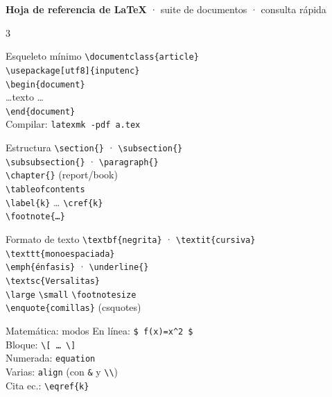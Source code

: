 \documentclass[9pt,a4paper,landscape]{extarticle}
\newcommand{\K}[1]{\texttt{\textbackslash #1}}
\begin{document}
\begin{center}
  {\Large\bfseries Hoja de referencia de \LaTeX}\quad
  {\footnotesize · suite de documentos · consulta rápida}
\end{center}
\vspace{-2pt}

\begin{multicols}{3}

\begin{blk}{Esqueleto mínimo}
\texttt{\textbackslash documentclass\{article\}}\\
\texttt{\textbackslash usepackage[utf8]\{inputenc\}}\\
\texttt{\textbackslash begin\{document\}}\\
\hspace*{1em}\dots texto \dots\\
\texttt{\textbackslash end\{document\}}\\[2pt]
Compilar: \texttt{latexmk -pdf a.tex}
\end{blk}

\begin{blk}{Estructura}
\K{section\{\}} · \K{subsection\{\}}\\
\K{subsubsection\{\}} · \K{paragraph\{\}}\\
\K{chapter\{\}} (report/book)\\
\K{tableofcontents}\\
\K{label\{k\}} \dots{} \K{cref\{k\}}\\
\K{footnote\{\dots\}}
\end{blk}

\begin{blk}{Formato de texto}
\K{textbf\{negrita\}} · \K{textit\{cursiva\}}\\
\K{texttt\{monoespaciada\}}\\
\K{emph\{énfasis\}} · \K{underline\{\}}\\
\K{textsc\{Versalitas\}}\\
\K{large} \K{small} \K{footnotesize}\\
\K{enquote\{comillas\}} (csquotes)
\end{blk}

\begin{blk}{Matemática: modos}
En línea: \texttt{\$ f(x)=x\^{}2 \$}\\
Bloque: \texttt{\textbackslash[ \dots{} \textbackslash]}\\
Numerada: \texttt{equation}\\
Varias: \texttt{align} (con \texttt{\&} y \texttt{\textbackslash\textbackslash})\\
Cita ec.: \K{eqref\{k\}}
\end{blk}


\end{multicols}
\end{document}

